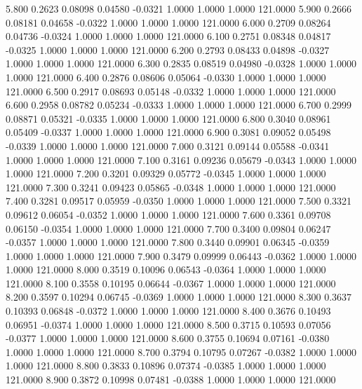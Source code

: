    5.800   0.2623   0.08098   0.04580  -0.0321   1.0000   1.0000   1.0000 121.0000
   5.900   0.2666   0.08181   0.04658  -0.0322   1.0000   1.0000   1.0000 121.0000
   6.000   0.2709   0.08264   0.04736  -0.0324   1.0000   1.0000   1.0000 121.0000
   6.100   0.2751   0.08348   0.04817  -0.0325   1.0000   1.0000   1.0000 121.0000
   6.200   0.2793   0.08433   0.04898  -0.0327   1.0000   1.0000   1.0000 121.0000
   6.300   0.2835   0.08519   0.04980  -0.0328   1.0000   1.0000   1.0000 121.0000
   6.400   0.2876   0.08606   0.05064  -0.0330   1.0000   1.0000   1.0000 121.0000
   6.500   0.2917   0.08693   0.05148  -0.0332   1.0000   1.0000   1.0000 121.0000
   6.600   0.2958   0.08782   0.05234  -0.0333   1.0000   1.0000   1.0000 121.0000
   6.700   0.2999   0.08871   0.05321  -0.0335   1.0000   1.0000   1.0000 121.0000
   6.800   0.3040   0.08961   0.05409  -0.0337   1.0000   1.0000   1.0000 121.0000
   6.900   0.3081   0.09052   0.05498  -0.0339   1.0000   1.0000   1.0000 121.0000
   7.000   0.3121   0.09144   0.05588  -0.0341   1.0000   1.0000   1.0000 121.0000
   7.100   0.3161   0.09236   0.05679  -0.0343   1.0000   1.0000   1.0000 121.0000
   7.200   0.3201   0.09329   0.05772  -0.0345   1.0000   1.0000   1.0000 121.0000
   7.300   0.3241   0.09423   0.05865  -0.0348   1.0000   1.0000   1.0000 121.0000
   7.400   0.3281   0.09517   0.05959  -0.0350   1.0000   1.0000   1.0000 121.0000
   7.500   0.3321   0.09612   0.06054  -0.0352   1.0000   1.0000   1.0000 121.0000
   7.600   0.3361   0.09708   0.06150  -0.0354   1.0000   1.0000   1.0000 121.0000
   7.700   0.3400   0.09804   0.06247  -0.0357   1.0000   1.0000   1.0000 121.0000
   7.800   0.3440   0.09901   0.06345  -0.0359   1.0000   1.0000   1.0000 121.0000
   7.900   0.3479   0.09999   0.06443  -0.0362   1.0000   1.0000   1.0000 121.0000
   8.000   0.3519   0.10096   0.06543  -0.0364   1.0000   1.0000   1.0000 121.0000
   8.100   0.3558   0.10195   0.06644  -0.0367   1.0000   1.0000   1.0000 121.0000
   8.200   0.3597   0.10294   0.06745  -0.0369   1.0000   1.0000   1.0000 121.0000
   8.300   0.3637   0.10393   0.06848  -0.0372   1.0000   1.0000   1.0000 121.0000
   8.400   0.3676   0.10493   0.06951  -0.0374   1.0000   1.0000   1.0000 121.0000
   8.500   0.3715   0.10593   0.07056  -0.0377   1.0000   1.0000   1.0000 121.0000
   8.600   0.3755   0.10694   0.07161  -0.0380   1.0000   1.0000   1.0000 121.0000
   8.700   0.3794   0.10795   0.07267  -0.0382   1.0000   1.0000   1.0000 121.0000
   8.800   0.3833   0.10896   0.07374  -0.0385   1.0000   1.0000   1.0000 121.0000
   8.900   0.3872   0.10998   0.07481  -0.0388   1.0000   1.0000   1.0000 121.0000
